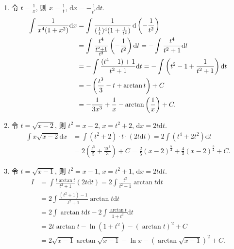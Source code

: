 \begin{solution}
\begin{enumerate}
        \item 令 $t = \frac{1}{x}$, 则 $x = \frac{1}{t}$, $\mathrm{d}x = -\frac{1}{t^2} \mathrm{d}t$.
              \begin{align*}
                  \int \frac{1}{x^4 (1 + x^2)} \mathrm{d}x & = \int \frac{1}{(\frac{1}{t})^4 (1 + \frac{1}{t^2})} \operatorname{d}\left(-\frac{1}{t^2}\right)                                \\
                                                           & = \int \frac{t^4}{\frac{t^2+1}{t^2}} \left(-\frac{1}{t^2}\right) \mathrm{d}t = -\int \frac{t^4}{t^2 + 1} \mathrm{d}t \\
                                                           & = -\int \frac{(t^4 - 1) + 1}{t^2 + 1} \mathrm{d}t = -\int \left(t^2 - 1 + \frac{1}{t^2 + 1}\right) \mathrm{d}t       \\
                                                           & = -\left( \frac{t^3}{3} - t + \arctan t \right) + C                                                                  \\
                                                           & = -\frac{1}{3x^3} + \frac{1}{x} - \arctan\left(\frac{1}{x}\right) + C.
              \end{align*}

        \item 令 $t = \sqrt{x - 2}$, 则 $t^2 = x - 2$, $x = t^2 + 2$, $\mathrm{d}x = 2t \mathrm{d}t$.
              \begin{align*}
                  \int x \sqrt{x - 2} \mathrm{d}x & = \int (t^2 + 2) \cdot t \cdot (2t \mathrm{d}t) = 2 \int (t^4 + 2t^2) \mathrm{d}t                                                  \\
                                                  & = 2 \left( \frac{t^5}{5} + \frac{2t^3}{3} \right) + C = \frac{2}{5} (x - 2)^{\frac{5}{2}} + \frac{4}{3} (x - 2)^{\frac{3}{2}} + C.
              \end{align*}

        \item 令 $t = \sqrt{x - 1}$, 则 $t^2 = x - 1$, $x = t^2 + 1$, $\mathrm{d}x = 2t \mathrm{d}t$.
              \begin{align*}
                  I & = \int \frac{t \arctan t}{t^2 + 1} (2t \mathrm{d}t) = 2 \int \frac{t^2}{t^2 + 1} \arctan t \mathrm{d}t \\
                    & = 2 \int \frac{(t^2 + 1) - 1}{t^2 + 1} \arctan t \mathrm{d}t                                           \\
                    & = 2 \int \arctan t \mathrm{d}t - 2 \int \frac{\arctan t}{1 + t^2} \mathrm{d}t                          \\
                    & = 2t \arctan t - \ln(1 + t^2) - (\arctan t)^2 + C                                                      \\
                    & = 2\sqrt{x - 1} \arctan \sqrt{x - 1} - \ln x - (\arctan \sqrt{x - 1})^2 + C.
              \end{align*}


\end{enumerate}
\end{solution}
